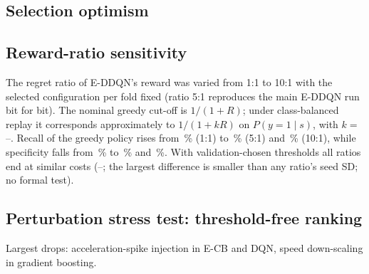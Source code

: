 \subsection{Selection optimism}
\begin{table}[h]
\centering
\caption{Pooled inner-validation 5:1 cost of the selected configuration (search seed, at its cost-minimizing threshold) versus its outer-test cost (seed ensemble, rule D1), averaged over the five outer folds (unweighted fold means, which differ from the pooled costs of the main results table).}
\footnotesize

\end{table}

\subsection{Reward-ratio sensitivity}
The regret ratio of E-DDQN's reward was varied from 1:1 to 10:1 with the selected configuration per fold fixed (ratio 5:1 reproduces the main E-DDQN run bit for bit). The nominal greedy cut-off is $1/(1+R)$; under class-balanced replay it corresponds approximately to $1/(1+kR)$ on $P(y=1\mid s)$, with $k=$ \SSEDDQNKMin--\SSEDDQNKMax. Recall of the greedy policy rises from \RatioArgOneRecall\,\% (1:1) to \RatioArgFiveRecall\,\% (5:1) and \RatioArgOneZeroRecall\,\% (10:1), while specificity falls from \RatioArgOneSpec\,\% to \RatioArgFiveSpec\,\% and \RatioArgOneZeroSpec\,\%. With validation-chosen thresholds all ratios end at similar costs (\RatioTunedOneCost--\RatioTunedOneZeroCost; the largest difference is smaller than any ratio's seed SD; no formal test).
\begin{table}[h]
\centering
\caption{Reward-ratio sensitivity of E-DDQN: greedy (arg-max) policy and validation-tuned threshold (rule D1); mean ($\pm$ SD) over five seeds.}
\footnotesize

\end{table}

\subsection{Perturbation stress test: threshold-free ranking}
Largest drops: acceleration-spike injection in E-CB and DQN, speed down-scaling in gradient boosting.
\begin{table}[h]
\centering
\caption{Pooled outer-test ROC-AUC of the seed-ensemble score on clean telemetry and under whole-session perturbations (last column: most negative and most positive change over all \AttAucNVariants{} whole-session variants, including the evasion-only candidates).}
\footnotesize

\end{table}

